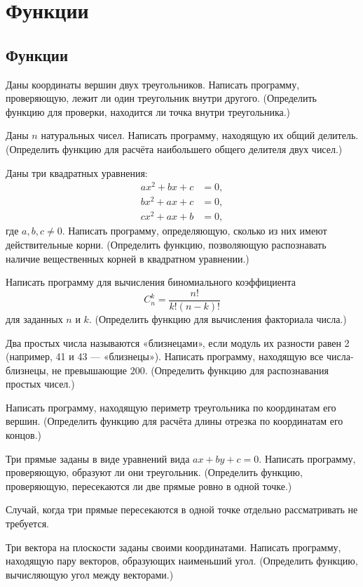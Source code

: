 \section{Функции}

\subsection{Функции}

\task Даны координаты вершин двух треугольников. Написать
программу, проверяющую, лежит ли один треугольник внутри другого.
(Определить функцию для проверки, находится ли точка внутри
треугольника.)

\task Даны $n$ натуральных чисел. Написать программу, находящую их
общий делитель. (Определить функцию для расчёта наибольшего общего
делителя двух чисел.)

\task Даны три квадратных уравнения:
\begin{align*}
a x^2 + b x + c &= 0,\\
b x^2 + a x + c &= 0,\\
c x^2 + a x + b &= 0,
\end{align*}
где $a,b,c\neq 0.$
Написать программу, определяющую, сколько из них имеют действительные
корни. (Определить функцию, позволяющую распознавать наличие
вещественных корней в квадратном уравнении.)

\task Написать программу для вычисления биномиального коэффициента
\[
C_n^k = \frac{n!}{k!(n-k)!}
\]
для заданных $n$ и $k.$ (Определить функцию для вычисления факториала
числа.)

\task Два простых числа называются «близнецами», если модуль их
разности равен 2 (например, 41 и 43 — «близнецы»). Написать программу,
находящую все числа-близнецы, не превышающие $200.$ (Определить
функцию для распознавания простых чисел.)

\task Написать программу, находящую периметр треугольника по
координатам его вершин. (Определить функцию для расчёта длины отрезка
по координатам его концов.)

\task Три прямые заданы в виде уравнений вида $ax+by+c=0.$ Написать
программу, проверяющую, образуют ли они треугольник. (Определить
функцию, проверяющую, пересекаются ли две прямые ровно в одной
точке.)

Случай, когда три прямые пересекаются в одной точке отдельно
рассматривать не требуется.

\task Три вектора на плоскости заданы своими координатами. Написать
программу, находящую пару векторов, образующих наименьший
угол. (Определить функцию, вычисляющую угол между векторами.)

